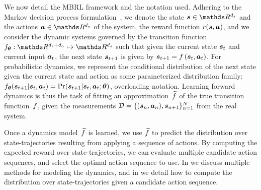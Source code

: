 We now detail the MBRL framework and the notation used.
Adhering to the Markov decision process formulation~\citep{Bellman1957}, we denote the state $\MDPState \in \R^\MDPdimState$ and the actions $\MDPAction \in \R^\MDPdimAction$ of the system, the reward function $r(\boldsymbol{s},\boldsymbol{a})$, and we consider the dynamic systems governed by the transition function $\MDPTransition_{\parameters}: \R^{\MDPdimState + \MDPdimAction} \mapsto \R^\MDPdimState$ such that given the current state $\boldsymbol{s}_t$ and current input $\boldsymbol{a}_t$, the next state $\boldsymbol{s}_{t + 1}$ is given by $\boldsymbol{s}_{t + 1} = f\left(\boldsymbol{s}_t, \boldsymbol{a}_{t}\right)$.
%
For probabilistic dynamics, we represent the conditional distribution of the next state given the current state and action as some parameterized distribution family: $f_{\boldsymbol{\theta}}(\boldsymbol{s}_{t + 1} | \boldsymbol{s}_{t}, \boldsymbol{a}_{t}) = {\text{Pr}}(\boldsymbol{s}_{t + 1} | \boldsymbol{s}_{t}, \boldsymbol{a}_{t};\boldsymbol{\theta})$, overloading notation.
%
Learning forward dynamics is thus the task of fitting an approximation~$\widetilde{f}$ of the true transition function~$f$, given the measurements $\mathcal{D} = \{(\boldsymbol{s}_n, \boldsymbol{a}_n), \boldsymbol{s}_{n+1}\}_{n=1}^{N}$ from the real system.

Once a dynamics model~$\widetilde{f}$ is learned, we use $\widetilde{f}$ to predict the distribution over state-trajectories resulting from applying a sequence of actions.
By computing the expected reward over state-trajectories, we can evaluate multiple candidate action sequences, and select the optimal action sequence to use.
In  we discuss multiple methods for modeling the dynamics, and in  we detail how to compute the distribution over state-trajectories given a candidate action sequence.

